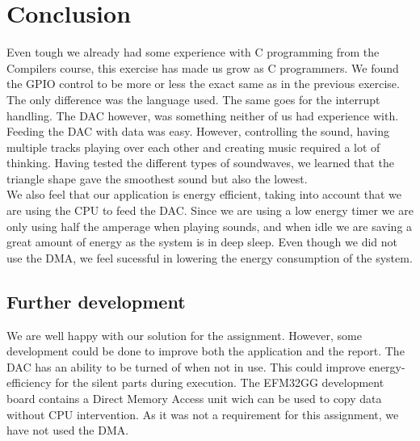\section{Conclusion}
Even tough we already had some experience with C programming from the Compilers course, this exercise has made us
grow as C programmers. We found the GPIO control to be more or less the exact same as in the previous exercise. The only difference was the language used. The same goes for the interrupt handling. The DAC however, was something neither of us had experience with. Feeding the DAC with data was easy. However, controlling the sound, having multiple tracks playing over each other and creating music required a lot of thinking. Having tested the different types of soundwaves, we learned that the triangle shape gave the smoothest sound but also the lowest. \\

We also feel that our application is energy efficient, taking into account that we are using the CPU to feed the DAC. Since we are using a low energy timer we are only using half the amperage when playing sounds, and when idle we are saving a great amount of energy as the system is in deep sleep. Even though we did not use the DMA, we feel sucessful in lowering the energy consumption of the system.
   
\subsection{Further development}
We are well happy with our solution for the assignment. However, some development could be done to improve both the application and the report. The DAC has an ability to be turned of when not in use. This could improve energy-efficiency for the silent parts during execution. The EFM32GG development board contains a Direct Memory Access unit wich can be used to copy data without CPU intervention. As it was not a requirement for this assignment, we have not used the DMA.
